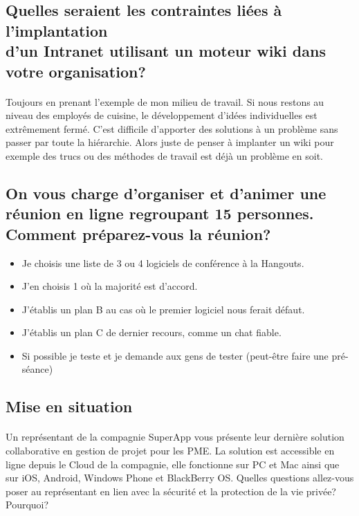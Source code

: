\documentclass[12pt]{article}
\begin{document}
\subsection{Quelles seraient les contraintes liées à l’implantation\\ d’un Intranet utilisant un moteur wiki dans votre organisation?}
\paragraph{}
Toujours en prenant l'exemple de mon milieu de travail. Si nous restons au niveau des employés de cuisine, le développement d'idées individuelles est extrêmement fermé. C'est difficile d'apporter des solutions à un problème sans passer par toute la hiérarchie. Alors juste de penser à implanter un wiki pour exemple des trucs ou des méthodes de travail est déjà un problème en soit.

\subsection{On vous charge d’organiser et d’animer une réunion en ligne regroupant 15 personnes.\\Comment préparez-vous la réunion?}
\begin{itemize}
    \item Je choisis une liste de 3 ou 4 logiciels de conférence à la Hangouts.
    \item J'en choisis 1 où la majorité est d'accord.
    \item J'établis un plan B au cas où le premier logiciel nous ferait défaut.
    \item J'établis un plan C de dernier recours, comme un chat fiable.
    \item Si possible je teste et je demande aux gens de tester (peut-être faire une pré-séance)
\end{itemize}

\subsection{Mise en situation}
\paragraph{}
Un représentant de la compagnie SuperApp vous présente leur dernière solution collaborative en gestion de projet pour les PME. La solution est accessible en ligne depuis le  Cloud  de la compagnie, elle fonctionne sur PC et Mac ainsi que sur iOS, Android, Windows Phone et BlackBerry OS. Quelles questions allez-vous poser au représentant en lien avec la sécurité et la protection de la vie privée? Pourquoi?
\end{document}
